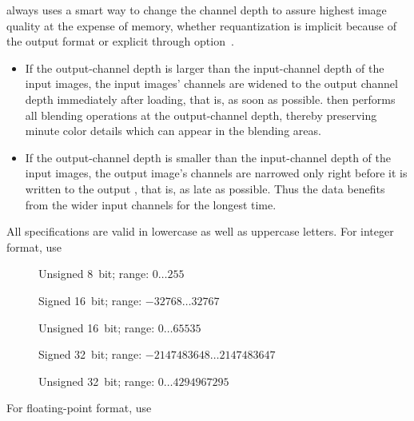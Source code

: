 \begin{codelist}
  \App{} always uses a smart way to change the channel depth to assure highest image quality at
  the expense of memory, whether requantization is implicit because of the output format or
  explicit through option~.

  \begin{itemize}
  \item
    If the output-channel depth is larger than the input-channel depth of the input images, the
    input images' channels are widened to the output channel depth immediately after loading,
    that is, as soon as possible.  \App{} then performs all blending operations at the
    output-channel depth, thereby preserving minute color details which can appear in the
    blending areas.

  \item
    If the output-channel depth is smaller than the input-channel depth of the input images, the
    output image's channels are narrowed only right before it is written to the output
    , that is, as late as possible.  Thus the data benefits from the wider input
    channels for the longest time.
  \end{itemize}

  All  specifications are valid in lowercase as well as uppercase letters.  For
  integer format, use

  \begin{description}
  \item[]\itemend
    Unsigned 8~bit; range: $0\dots255$

  \item[]\itemend
    Signed 16~bit; range: $-32768\dots32767$

  \item[]\itemend
    Unsigned 16~bit; range: $0\dots65535$

  \item[]\itemend
    Signed 32~bit; range: $-2147483648\dots2147483647$

  \item[]\itemend
    Unsigned 32~bit; range: $0\dots4294967295$
  \end{description}

  For floating-point format, use


\end{codelist}
